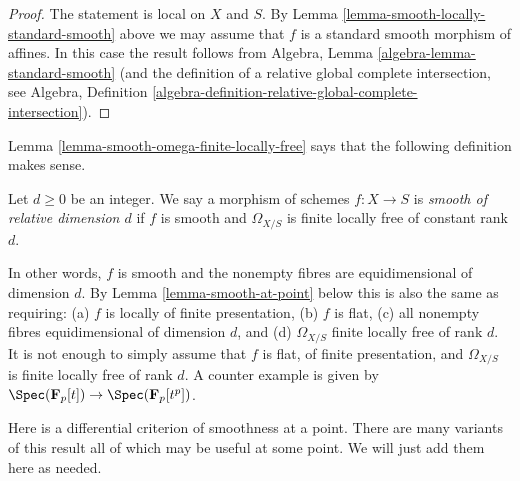 \begin{proof}
The statement is local on $X$ and $S$.
By Lemma \ref{lemma-smooth-locally-standard-smooth}
above we may assume that $f$ is a standard smooth morphism of affines.
In this case the result follows from
Algebra, Lemma \ref{algebra-lemma-standard-smooth}
(and the definition of a relative global complete intersection, see
Algebra,
Definition \ref{algebra-definition-relative-global-complete-intersection}).
\end{proof}

\noindent
Lemma \ref{lemma-smooth-omega-finite-locally-free}
says that the following definition makes sense.

\begin{definition}
\label{definition-smooth-relative-dimension}
Let $d \geq 0$ be an integer. We say a morphism of schemes $f : X \to S$
is {\it smooth of relative dimension $d$} if $f$ is smooth and
$\Omega_{X/S}$ is finite locally free of constant rank $d$.
\end{definition}

\noindent
In other words, $f$ is smooth and the nonempty fibres are equidimensional
of dimension $d$. By Lemma \ref{lemma-smooth-at-point} below this is also
the same as requiring: (a) $f$ is locally of finite presentation, (b) $f$ is
flat, (c) all nonempty fibres equidimensional of dimension $d$, and (d)
$\Omega_{X/S}$ finite locally free of rank $d$. It is not enough to simply
assume that $f$ is flat, of finite presentation, and $\Omega_{X/S}$ is
finite locally free of rank $d$. A counter example is given by
$\Spec(\mathbf{F}_p[t]) \to \Spec(\mathbf{F}_p[t^p])$.

\medskip\noindent
Here is a differential criterion of smoothness at a point.
There are many variants of this result
all of which may be useful at some point. We will just add them
here as needed.

